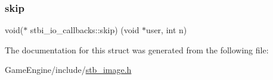 \mbox{\label{structstbi__io__callbacks_a257aac5480a90a6c4b8fbe86c1b01068}} 
\subsubsection{\texorpdfstring{skip}{skip}}
{\footnotesize\ttfamily void($\ast$ stbi\+\_\+io\+\_\+callbacks\+::skip) (void $\ast$user, int n)}



The documentation for this struct was generated from the following file\+:\begin{DoxyCompactItemize}
\item 
Game\+Engine/include/\mbox{\hyperlink{stb__image_8h}{stb\+\_\+image.\+h}}\end{DoxyCompactItemize}
